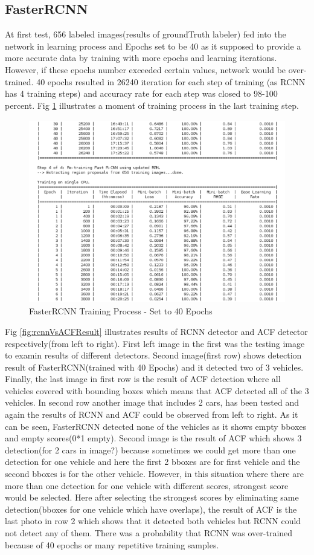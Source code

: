 \subsection{FasterRCNN}
At first test, 656 labeled images(results of groundTruth labeler) fed into the network in learning process and Epochs set to be 40 as it supposed to provide a more accurate data by training with more epochs and learning iterations. However, if these epochs number exceeded certain values, network would be over-trained. 40 epochs resulted in 26240 iteration for each step of training (as RCNN has 4 training steps) and accuracy rate for each step was closed to 98-100 percent. Fig \ref{fig:40E_training} illustrates a moment of training process in the last training step.
\begin{figure}
    \centering
     \includegraphics[width=14cm, height=8cm]{images/rcnn40E.pdf}
     \caption{FasterRCNN Training Process - Set to 40 Epochs }
     \label{fig:40E_training}
\end{figure}
Fig \ref{fig:rcnnVsACFResult} illustrates results of RCNN detector and ACF detector respectively(from left to right). First left image in the first was the testing image to examin results of different detectors. Second image(first row) shows detection result of FasterRCNN(trained with 40 Epochs) and it detected two of 3 vehicles. Finally, the last image in first row is the result of ACF detection where all vehicles covered with bounding boxes which means that ACF detected all of the 3 vehicles. In second row another image that includes 2 cars, has been tested and again the results of RCNN and ACF could be observed from left to right. As it can be seen, FasterRCNN detected none of the vehicles as it shows empty bboxes and empty scores(0*1 empty). Second image is the result of ACF which shows 3 detection(for 2 cars in image?) because sometimes we could get more than one detection for one vehicle and here the first 2 bboxes are for first vehicle and the second bboxes is for the other vehicle. However, in this situation where there are more than one detection for one vehicle with different scores, strongest score would be selected. Here after selecting the strongest scores by eliminating same detection(bboxes for one vehicle which have overlaps), the result of ACF is the last photo in row 2 which shows that it detected both vehicles but RCNN could not detect any of them. There was a probability that RCNN was over-trained because of 40 epochs or many repetitive training samples.
